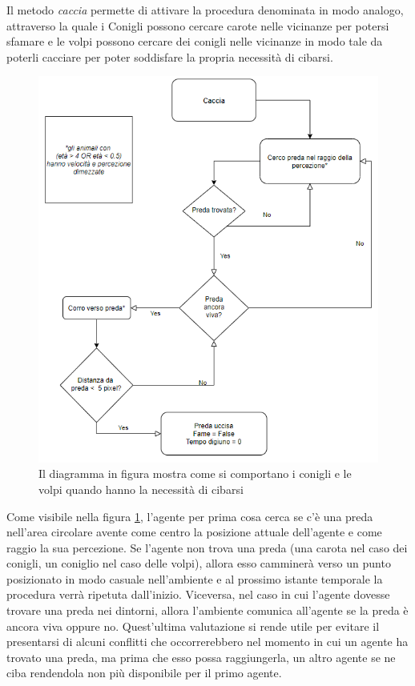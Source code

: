 \documentclass[11pt]{article}
\begin{document}
Il metodo \emph{caccia} permette di attivare la procedura denominata in modo analogo, attraverso la quale i Conigli possono cercare carote nelle vicinanze per potersi sfamare e le volpi possono cercare dei conigli nelle vicinanze in modo tale da poterli cacciare per poter soddisfare la propria necessità di cibarsi.
\begin{figure}
     \centering
     \includegraphics[scale = 0.75]{Caccia.png}
     \caption{Il diagramma in figura mostra come si comportano i conigli e le volpi quando hanno la necessità di cibarsi}
     \label{fig:diagrammaCaccia}
\end{figure}
Come visibile nella figura \ref{fig:diagrammaCaccia}, l'agente per prima cosa cerca se c'è una preda nell'area circolare avente come centro la posizione attuale dell'agente e come raggio la sua percezione. Se l'agente non trova una preda (una carota nel caso dei conigli, un coniglio nel caso delle volpi), allora esso camminerà verso un punto posizionato in modo casuale nell'ambiente e al prossimo istante temporale la procedura verrà ripetuta dall'inizio. 
Viceversa, nel caso in cui l'agente dovesse trovare una preda nei dintorni, allora l'ambiente comunica all'agente se la preda è ancora viva oppure no. Quest'ultima valutazione si rende utile per evitare il presentarsi di alcuni conflitti che occorrerebbero nel momento in cui un agente ha trovato una preda, ma prima che esso possa raggiungerla, un altro agente se ne ciba rendendola non più disponibile per il primo agente.
\end{document}
